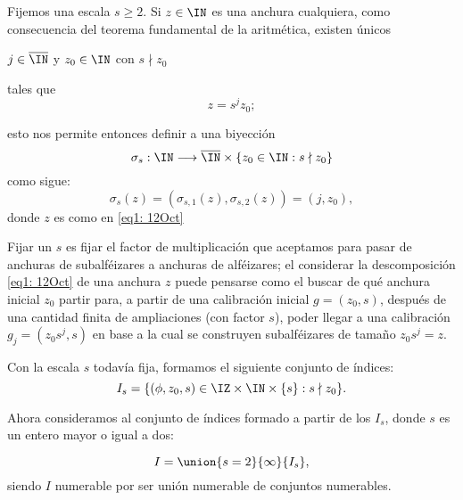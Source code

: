 Fijemos una escala $s \geq 2$.
Si $z \in \IN$ es una anchura cualquiera,
como consecuencia
del teorema fundamental de la aritmética, existen únicos
\begin{center}
$j \in \overline{\IN}$ y $z_{0} \in \IN$ con $s \nmid z_{0}$
\end{center}
tales que 
\begin{equation}
\label{eq1: 12Oct}
z=s^{j}z_{0};
\end{equation}

\noindent
esto nos permite entonces definir a una biyección
$$\sigma_{s}: \IN \longrightarrow \overline{\IN} \times 
\{ z_{0} \in \IN : s \nmid z_{0} \} $$ como sigue:
\begin{equation}
\label{eq: definicion de la biyeccion sigma s}
\sigma_{s}(z)=(\sigma_{s,1}(z), \sigma_{s,2}(z))=(j,z_{0}),
\end{equation}
\noindent
donde $z$ es como en \eqref{eq1: 12Oct}

Fijar un $s$ es fijar el factor
de multiplicación que aceptamos para pasar de anchuras
de subalféizares a anchuras de alféizares; el considerar
la descomposición \eqref{eq1: 12Oct} de una anchura $z$
puede pensarse como el buscar 
de qué anchura inicial $z_{0}$
partir para, 
a partir de una calibración inicial $g=(z_{0},s)$,
después de una cantidad finita de ampliaciones
(con factor $s$), poder llegar
a una calibración $g_{j}= (z_{0}s^{j}, s)$
en base a la cual se construyen subalféizares
de tamaño $z_{0}s^{j}=z$.


Con la escala $s$ todavía fija, formamos el 
siguiente conjunto de índices:
\[
I_{s}= \{ (\phi, z_{0}, s) \in \IZ \times \IN \times \{s\}  : s \nmid z_{0} \}.
\]

Ahora consideramos al conjunto de índices
formado a partir de los $I_{s}$, donde $s$
es un entero mayor o igual a dos:

\begin{equation}
\label{eq10: 14Oct}
I= \union{s=2}{\infty}{I_{s}},
\end{equation}
siendo $I$ numerable por ser unión numerable de 
conjuntos numerables.

